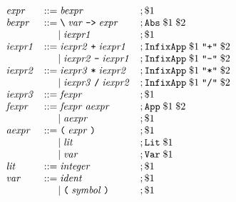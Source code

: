 \documentclass[12pt]{article}
\newcommand*{\BNFassign}{\mathrel{::=}}
\newcommand*{\BNFor}{\hspace{1.4em}\mid}
\newcommand*{\tokenc}[1]{\text{\texttt{#1}}}
\begin{document}
\pagestyle{empty}

\begin{align*}
  \begin{array}{lll}
  \mathit{expr}
  &\BNFassign \mathit{bexpr} &;\$1 \\
  \mathit{bexpr}
  &\BNFassign \tokenc{\textbackslash}\;\mathit{var}\;\tokenc{->}\;\mathit{expr} &;\tokenc{Abs}\;\$1\;\$2 \\
  &\BNFor \mathit{iexpr1} &;\$1 \\
  \mathit{iexpr1}
  &\BNFassign \mathit{iexpr2}\;\tokenc{+}\;\mathit{iexpr1} &;\tokenc{InfixApp}\;\$1\;\tokenc{"+"}\;\$2 \\
  &\BNFor \mathit{iexpr2}\;\tokenc{-}\;\mathit{iexpr1} &;\tokenc{InfixApp}\;\$1\;\tokenc{"-"}\;\$2 \\
  \mathit{iexpr2}
  &\BNFassign \mathit{iexpr3}\;\tokenc{*}\;\mathit{iexpr2} &;\tokenc{InfixApp}\;\$1\;\tokenc{"*"}\;\$2 \\
  &\BNFor \mathit{iexpr3}\;\tokenc{/}\;\mathit{iexpr2} &;\tokenc{InfixApp}\;\$1\;\tokenc{"/"}\;\$2 \\
  \mathit{iexpr3}
  &\BNFassign \mathit{fexpr} &;\$1 \\
  \mathit{fexpr}
  &\BNFassign \mathit{fexpr}\;\mathit{aexpr} &;\tokenc{App}\;\$1\;\$2 \\
  &\BNFor \mathit{aexpr} &;\$1 \\
  \mathit{aexpr}
  &\BNFassign \tokenc{(}\;\mathit{expr}\;\tokenc{)} &;\$1 \\
  &\BNFor \mathit{lit} &;\tokenc{Lit}\;\$1 \\
  &\BNFor \mathit{var} &;\tokenc{Var}\;\$1 \\
  \mathit{lit}
  &\BNFassign \mathit{integer} &;\$1 \\
  \mathit{var}
  &\BNFassign \mathit{ident} &;\$1 \\
  &\BNFor \tokenc{(}\;\mathit{symbol}\;\tokenc{)} &;\$1
  \end{array}
\end{align*}
\end{document}
